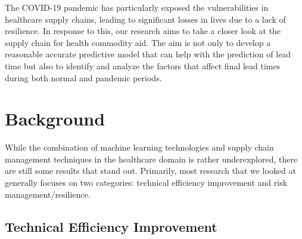 \documentclass[12pt]{report}
\begin{document}
The COVID-19 pandemic has particularly exposed the vulnerabilities in healthcare supply chains, leading to significant losses in lives due to a lack of resilience. In response to this, our research aims to take a closer look at the supply chain for health commodity aid. The aim is not only to develop a reasonable accurate predictive model that can help with the prediction of lead time but also to identify and analyze the factors that affect final lead times during both normal and pandemic periods.

\section{Background}

While the combination of machine learning technologies and supply chain management techniques in the healthcare domain is rather underexplored, there are still some results that stand out. Primarily, most research that we looked at generally focuses on two categories: technical efficiency improvement and risk management/resilience.

\subsection{Technical Efficiency Improvement}
\end{document}
